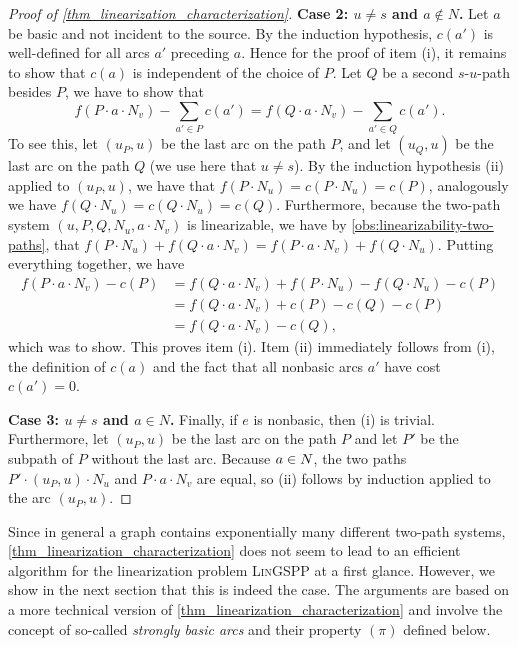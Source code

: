 \begin{proof}[Proof of \cref{thm_linearization_characterization}]
    \textbf{Case 2: $u \neq s$ and $a \not\in N$.} Let $a$ be basic and not incident to the source. By the induction hypothesis, $c(a')$ is well-defined for all arcs $a'$ preceding $a$. Hence for the proof of item (i), it remains to show that $c(a)$ is independent of the choice of $P$. Let $Q$ be a second $s$-$u$-path besides $P$, we have to show that 
    \[
    f(P \cdot a \cdot N_v) - \sum_{a' \in P}c(a') = f(Q \cdot a \cdot N_v) - \sum_{a' \in Q}c(a').
    \]
    To see this, let $(u_P, u)$ be the last arc on the path $P$, and let $(u_Q, u)$ be the last arc on the path $Q$ (we use here that $u \neq s$). By the induction hypothesis (ii) applied to $(u_P, u)$, we have that $f(P \cdot N_u) = c(P \cdot N_u) = c(P)$, analogously we have $f(Q \cdot N_u) = c(Q \cdot N_u) = c(Q)$. Furthermore, because the two-path system $(u, P, Q, N_u, a \cdot N_v)$ is linearizable, we have by \cref{obs:linearizability-two-paths}, that $f(P \cdot N_u) + f(Q \cdot a \cdot N_v) = f(P \cdot a \cdot N_v) + f(Q \cdot N_u)$. Putting everything together, we have
    \begin{align*}
         f(P \cdot a \cdot N_v) - c(P) &= f(Q \cdot a \cdot N_v) + f(P \cdot N_u) - f(Q \cdot N_u) - c(P)\\
         &= f(Q \cdot a \cdot N_v) + c(P) - c(Q) - c(P)\\
         &= f(Q \cdot a \cdot N_v) - c(Q),
    \end{align*}
    which was to show. This proves item (i). Item (ii) immediately follows from (i), the definition of $c(a)$ and the fact that all nonbasic arcs $a'$ have cost $c(a') = 0$.
    
    \textbf{Case 3: $u \neq s$ and $a \in N$.} Finally, if $e$ is nonbasic, then (i) is trivial. Furthermore, let $(u_P, u)$ be the last arc on the path $P$ and let $P'$ be the subpath of $P$ without the last arc. Because $a \in N$, the two paths $P' \cdot (u_P, u) \cdot N_u$ and $P \cdot a \cdot N_v$ are equal, so (ii) follows by induction applied to the arc $(u_P, u)$.
     
\end{proof}

Since in general a graph contains exponentially many different two-path systems,   \cref{thm_linearization_characterization} does not seem to lead to  an  efficient algorithm for  the linearization problem \textsc{Lin}GSPP at a first glance. However, we show in the next section that this is indeed the case. The arguments  are based on a more technical version of \cref{thm_linearization_characterization} and involve the concept of  so-called \emph{strongly basic arcs} and their property $(\pi)$ defined below.


